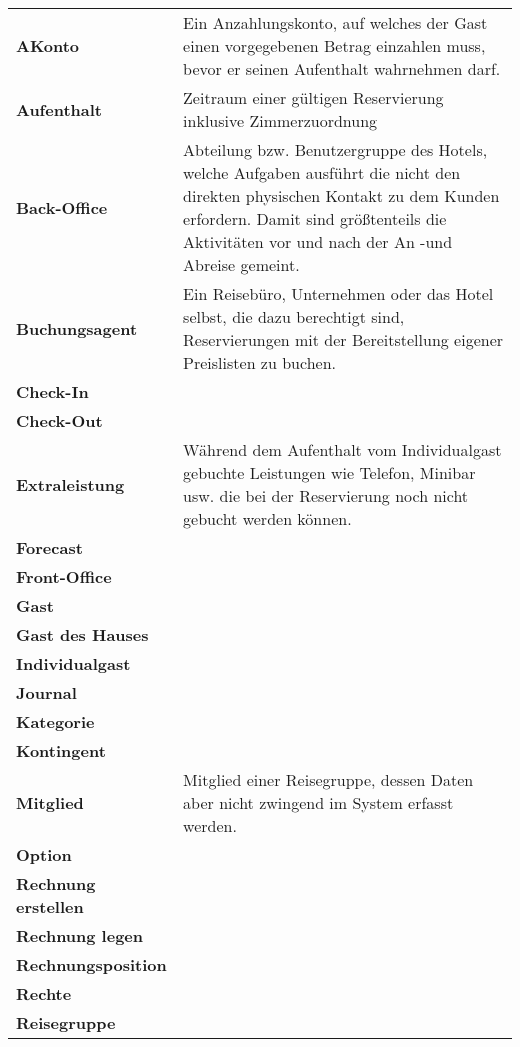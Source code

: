 \documentclass[../Pflichtenheft.tex]{subfiles}
\begin{document}
    \begin{longtable}{p{5cm} p{10cm}}
        \textbf{AKonto} & Ein Anzahlungskonto, auf welches der Gast einen vorgegebenen Betrag einzahlen muss, bevor er seinen Aufenthalt wahrnehmen darf. \\[0.5cm]
        \textbf{Aufenthalt} & Zeitraum einer gültigen Reservierung inklusive Zimmerzuordnung \\[0.5cm]
        \textbf{Back-Office} & Abteilung bzw. Benutzergruppe des Hotels, welche Aufgaben ausführt die nicht den direkten physischen Kontakt zu dem Kunden erfordern. Damit sind größtenteils die Aktivitäten vor und nach der An -und Abreise gemeint.\\[0.5cm]
        \textbf{Buchungsagent} & Ein Reisebüro, Unternehmen oder das Hotel selbst, die dazu berechtigt sind, Reservierungen mit der Bereitstellung eigener Preislisten zu buchen. \\[0.5cm]
        \textbf{Check-In} & \\[0.5cm]
        \textbf{Check-Out} & \\[0.5cm]
        \textbf{Extraleistung} & Während dem Aufenthalt vom Individualgast gebuchte Leistungen wie Telefon, Minibar usw. die bei der Reservierung noch nicht gebucht werden können.\\[0.5cm]
        \textbf{Forecast} &  \\[0.5cm]
        \textbf{Front-Office} &  \\[0.5cm]
        \textbf{Gast} & \\[0.5cm]
        \textbf{Gast des Hauses} & \\[0.5cm]
        \textbf{Individualgast} & \\[0.5cm]
        \textbf{Journal} & \\[0.5cm]
        \textbf{Kategorie} &  \\[0.5cm]
        \textbf{Kontingent} & \\[0.5cm]
        \textbf{Mitglied} & Mitglied einer Reisegruppe, dessen Daten aber nicht zwingend im System erfasst werden. \\[0.5cm]
        \textbf{Option} & \\[0.5cm]
        \textbf{Rechnung erstellen} & \\[0.5cm]
        \textbf{Rechnung legen} & \\[0.5cm]
        \textbf{Rechnungsposition} & \\[0.5cm]
        \textbf{Rechte} & \\[0.5cm]
        \textbf{Reisegruppe} & \\[0.5cm]

\end{longtable}
\end{document}
